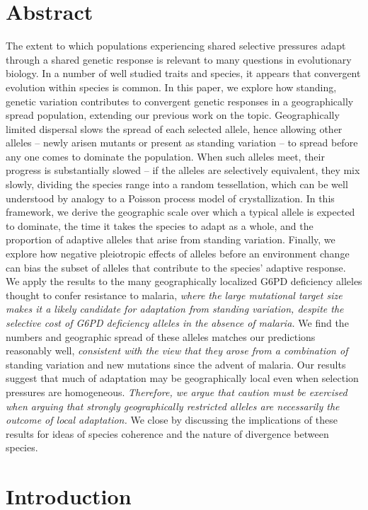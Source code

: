 \documentclass{article}
\newcommand{\mfp}[1]{{\it\color{red}#1}}
\begin{document}
\section*{Abstract}
The extent to which populations experiencing shared selective pressures
adapt through a shared genetic response
is relevant to many questions in evolutionary biology. 
In a number of well studied traits and species, 
it appears that convergent evolution within species is common. 
In this paper, 
we explore how standing, genetic variation contributes to
convergent genetic responses in a geographically spread population,
extending our previous work on the topic.
Geographically limited dispersal slows the spread of each selected allele,
hence allowing other alleles 
-- newly arisen mutants or present as standing variation -- 
to spread before any one comes to dominate the population. 
When such alleles meet, their progress is substantially slowed 
-- if the alleles are selectively equivalent, 
they mix slowly, dividing the species range into a random tessellation,
which can be well understood by analogy to a Poisson process model of crystallization. 
In this framework, 
we derive the geographic scale over which a typical allele is expected to dominate, 
the time it takes the species to adapt as a whole,
and the proportion of adaptive alleles that arise from standing variation.
Finally, we explore how negative pleiotropic effects of alleles before an environment change 
can bias the subset of alleles that contribute to the species' adaptive response. 
We apply the results to the many geographically localized G6PD
deficiency alleles thought to confer resistance to malaria, \mfp{where the large
mutational target size makes it a likely candidate for adaptation
from standing variation, despite the selective cost of G6PD
deficiency alleles in the absence of malaria.}
We find the numbers and geographic spread of these alleles matches our predictions reasonably well,
\mfp{consistent with the view that they arose from a combination of} 
standing variation and new mutations since the advent of malaria.
Our results suggest that much of adaptation may be geographically local 
even when selection pressures are homogeneous. 
\mfp{Therefore, we argue that caution must be exercised when arguing that strongly
geographically restricted alleles are necessarily the outcome of local adaptation.}
We close by discussing the implications of these results for 
ideas of species coherence and the nature of divergence between species. 


\section{Introduction}
\end{document}
